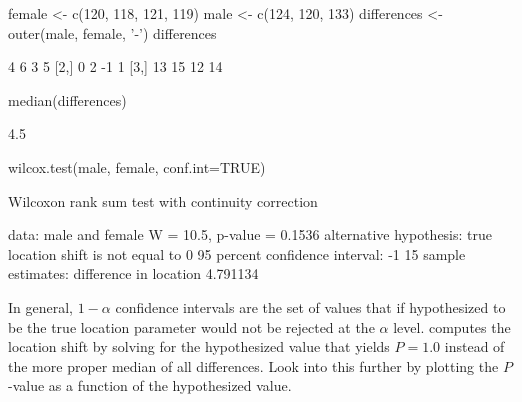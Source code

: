 \begin{Schunk}
\begin{Sinput}
female <- c(120, 118, 121, 119)
male   <- c(124, 120, 133)
differences <- outer(male, female, '-')
differences
\end{Sinput}
\begin{Soutput}
     [,1] [,2] [,3] [,4]
[1,]    4    6    3    5
[2,]    0    2   -1    1
[3,]   13   15   12   14
\end{Soutput}
\begin{Sinput}
median(differences)
\end{Sinput}
\begin{Soutput}
[1] 4.5
\end{Soutput}
\begin{Sinput}
wilcox.test(male, female, conf.int=TRUE)
\end{Sinput}
\begin{Soutput}

	Wilcoxon rank sum test with continuity correction

data:  male and female
W = 10.5, p-value = 0.1536
alternative hypothesis: true location shift is not equal to 0
95 percent confidence interval:
 -1 15
sample estimates:
difference in location 
              4.791134 
\end{Soutput}
\end{Schunk}
In general, $1 - \alpha$ confidence intervals are the set of values that if
hypothesized to be the true location parameter would not be rejected
at the $\alpha$ level.   computes the location shift
by solving for the hypothesized value that yields $P=1.0$ instead of
the more proper median of all differences.  Look into this further by
plotting the $P$-value as a function of the hypothesized value.
